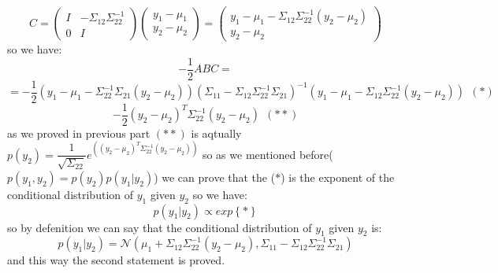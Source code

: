 \begin{qsolve}
\begin{qsolve}[]
		$$C = \begin{pmatrix} I & -\Sigma_{12}\Sigma_{22}^{-1} \\ 0 & I \end{pmatrix} \begin{pmatrix} y_1-\mu_1 \\ y_2-\mu_2 \end{pmatrix} = \begin{pmatrix} y_1-\mu_1 - \Sigma_{12}\Sigma_{22}^{-1}(y_2-\mu_2) \\ y_2-\mu_2 \end{pmatrix}$$
		so we have:
		$$-\dfrac{1}{2}ABC =$$
		$$ = -\dfrac{1}{2} (y_1-\mu_1 - \Sigma_{22}^{-1}\Sigma_{21}(y_2-\mu_2))(\Sigma_{11}-\Sigma_{12}\Sigma_{22}^{-1}\Sigma_{21})^{-1}(y_1-\mu_1 - \Sigma_{12}\Sigma_{22}^{-1}(y_2-\mu_2))\ \  (\ast )$$
		$$- \dfrac{1}{2} (y_2-\mu_2)^T\Sigma_{22}^{-1}(y_2-\mu_2)\ \ (\ast \ast )$$
		as we proved in previous part $(\ast \ast)$ is aqtually $p(y_2) = \dfrac{1}{\sqrt{\Sigma_{22}}}e^{\left((y_2-\mu_2)^T \Sigma_{22}^{-1}(y_2-\mu_2)\right)}$ so as we mentioned before($p(y_1,y_2) = p(y_2)p(y_1|y_2)$) we can prove that the ($\ast $) is the exponent of the conditional distribution of $y_1$ given $y_2$ so we have:
		\splitqsolve[\splitqsolve]
		$$p(y_1|y_2) \propto exp\left\{\ast \right\}$$
		so by defenition we can say that the conditional distribution of $y_1$ given $y_2$ is:
		$$p(y_1|y_2) = \mathcal{N} (\mu_1 + \Sigma_{12}\Sigma_{22}^{-1}(y_2 - \mu_2), \Sigma_{11} - \Sigma_{12}\Sigma_{22}^{-1}\Sigma_{21})$$
		and this way the second statement is proved.
	\end{qsolve}
\end{qsolve}
